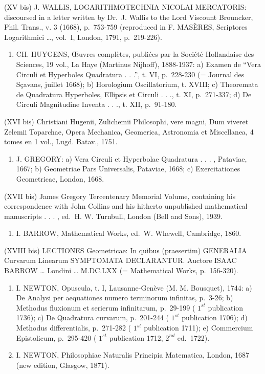 (XV bis) J. WALLIS, LOGARITHMOTECHNIA NICOLAI MERCATORIS: discoursed in a letter written by Dr.~J. Wallis to the Lord Viscount Brouncker, Phil. Trans., v. 3 (1668), p.~753-759 (reproduced in F. MASÈRES, Scriptores Logarithmici \ldots, vol.~I, London, 1791, p.~219-226).

\begin{enumerate}
\def\labelenumi{(\Roman{enumi})}
\setcounter{enumi}{15}
\tightlist
\item
  CH. HUYGENS, Œuvres complètes, publiées par la Société Hollandaise des Sciences, 19 vol., La Haye (Martinus Nijhoff), 1888-1937: a) Examen de ``Vera Circuli et Hyperboles Quadratura . . .'', t. VI, p.~228-230 (= Journal des Sçavans, juillet 1668); b) Horologium Oscillatorium, t. XVIII; c) Theoremata de Quadratura Hyperboles, Ellipsis et Circuli . . ., t. XI, p.~271-337; d) De Circuli Magnitudine Inventa . . ., t. XII, p.~91-180.
\end{enumerate}

(XVI bis) Christiani Hugenii, Zulichemii Philosophi, vere magni, Dum viveret Zelemii Toparchae, Opera Mechanica, Geomerica, Astronomia et Miscellanea, 4 tomes en 1 vol., Lugd. Batav., 1751.

\begin{enumerate}
\def\labelenumi{(\Roman{enumi})}
\setcounter{enumi}{16}
\tightlist
\item
  J. GREGORY: a) Vera Circuli et Hyperbolae Quadratura . . . , Pataviae, 1667; b) Geometriae Pars Universalis, Pataviae, 1668; c) Exercitationes Geometricae, London, 1668.
\end{enumerate}

(XVII bis) James Gregory Tercentenary Memorial Volume, containing his correspondence with John Collins and his hitherto unpublished mathematical manuscripts . . . , ed.~H. W. Turnbull, London (Bell and Sons), 1939.

\begin{enumerate}
\def\labelenumi{(\Roman{enumi})}
\setcounter{enumi}{17}
\tightlist
\item
  I. BARROW, Mathematical Works, ed.~W. Whewell, Cambridge, 1860.
\end{enumerate}

(XVIII bis) LECTIONES Geometricae: In quibus (praesertim) GENERALIA Curvarum Linearum SYMPTOMATA DECLARANTUR. Auctore ISAAC BARROW \ldots{} Londini \ldots{} M.DC.LXX (= Mathematical Works, p.~156-320).

\begin{enumerate}
\def\labelenumi{(\Roman{enumi})}
\setcounter{enumi}{18}
\item
  I. NEWTON, Opuscula, t. I, Lausanne-Genève (M. M. Bousquet), 1744: a) De Analysi per aequationes numero terminorum infinitas, p.~3-26; b) Methodus fluxionum et serierum infinitarum, p.~29-199 ( \(1^{st}\) publication 1736); c) De Quadratura curvarum, p.~201-244 ( \(1^{st}\) publication 1706); d) Methodus differentialis, p.~271-282 ( \(1^{st}\) publication 1711); e) Commercium Epistolicum, p.~295-420 ( \(1^{st}\) publication 1712, \(2^{nd}\) ed.~1722).
\item
  I. NEWTON, Philosophiae Naturalis Principia Matematica, London, 1687 (new edition, Glasgow, 1871).
\end{enumerate}

